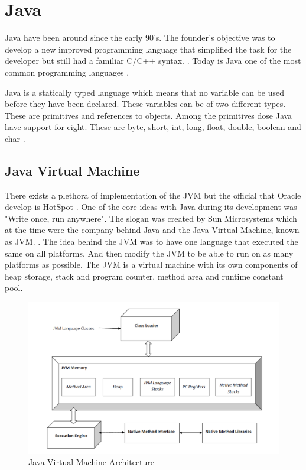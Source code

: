 \section{Java}
\label{JavaInstrumentation}
Java have been around since the early 90's. The founder's objective was to develop a new improved programming language that simplified the task for the developer but still had a familiar C/C++ syntax. \parencite{OracleVoice}. Today is Java one of the most common programming languages \parencite{octoverse}.

Java is a statically typed language which means that no variable can be used before they have been declared. These variables can be of two different types. These are primitives and references to objects. Among the primitives dose Java have support for eight. These are byte, short, int, long, float, double, boolean and char \parencite{primjav}.


\subsection{Java Virtual Machine}
There exists a plethora of implementation of the JVM but the official that Oracle develop is HotSpot \parencite{hotSpot}. One of the core ideas with Java during its development was "Write once, run anywhere". The slogan was created by Sun Microsystems which at the time were the company behind Java and the Java Virtual Machine, known as JVM. \parencite{Craig_2006}. The idea behind the JVM was to have one language that executed the same on all platforms. And then modify the JVM to be able to run on as many platforms as possible. The JVM is a virtual machine with its own components of heap storage, stack and program counter, method area and runtime constant pool. 

\begin{figure}
  \centering
  \includegraphics[width=\textwidth]{images/JvmSpec7.png}
  \caption{Java Virtual Machine Architecture}
  \label{fig:JVM}
\end{figure}

